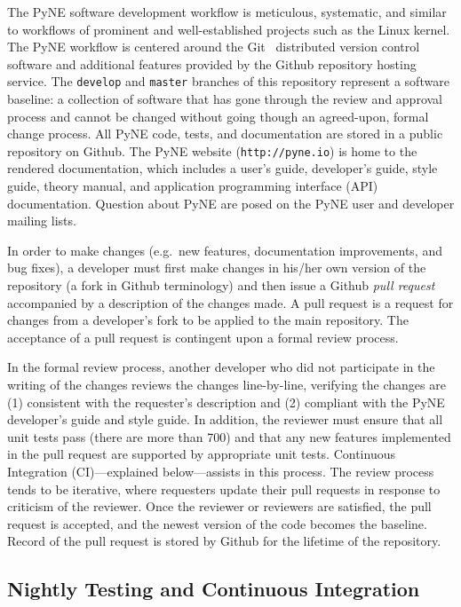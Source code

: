 \documentclass{anstrans}
\begin{document}
The PyNE software development workflow is meticulous, systematic, and similar
to workflows of prominent and well-established projects such as the Linux kernel.
The PyNE workflow is centered around the Git~\cite{git_2014} distributed version control software
and additional features provided by the Github repository hosting service.
The \texttt{develop} and \texttt{master} branches of this repository represent
a software baseline: a collection of software that has gone through the review and
approval process and cannot be changed without going though an agreed-upon, formal change process.
All PyNE code, tests, and documentation are stored in a public
repository on Github. The PyNE website (\texttt{http://pyne.io}) is home to the
rendered documentation, which includes a user's guide, developer's guide, style
guide, theory manual, and application programming interface (API) documentation.
Question about PyNE are posed on the PyNE user and developer mailing lists.

In order to make changes (e.g.\ new features, documentation improvements, and
bug fixes), a developer must first make changes in his/her own version of the
repository (a fork in Github terminology) and then issue a Github \emph{pull
request} accompanied by a description of the changes made. A pull request
is a request for changes from a developer's fork to be applied to the main
repository. The acceptance of a pull request is contingent upon a formal review process.

In the formal review process, another developer who did not participate in the writing of the changes
reviews the changes line-by-line, verifying the changes are (1) consistent with
the requester's description and (2) compliant with the PyNE
developer's guide and style guide. In addition, the reviewer must
ensure that all unit tests pass (there are more than 700) and that
any new features implemented in the pull request are supported by appropriate unit
tests. Continuous Integration (CI)---explained below---assists in this process.
The review process tends to be iterative, where requesters update their pull
requests in response to criticism of the reviewer. Once the reviewer or
reviewers are satisfied, the pull request is accepted, and the newest version of the
code becomes the baseline. Record of the pull request is stored by Github for the lifetime of the repository.


\subsection{Nightly Testing and Continuous Integration} 
\end{document}
